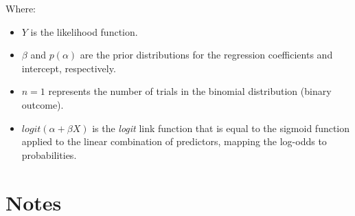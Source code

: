 \documentclass[
  letterpaper,
  DIV=11,
  numbers=noendperiod]{scrreprt}
\begin{document}
Where:

\begin{itemize}
\item
  \(Y\) is the likelihood function.
\item
  \(\beta\) and \(p(\alpha)\) are the prior distributions for the
  regression coefficients and intercept, respectively.
\item
  \(n = 1\) represents the number of trials in the binomial distribution
  (binary outcome).
\item
  \(logit(\alpha + \beta X)\) is the \emph{logit} link function that is
  equal to the sigmoid function applied to the linear combination of
  predictors, mapping the log-odds to probabilities.
\end{itemize}

\section{Notes}\label{notes-1}
\end{document}
